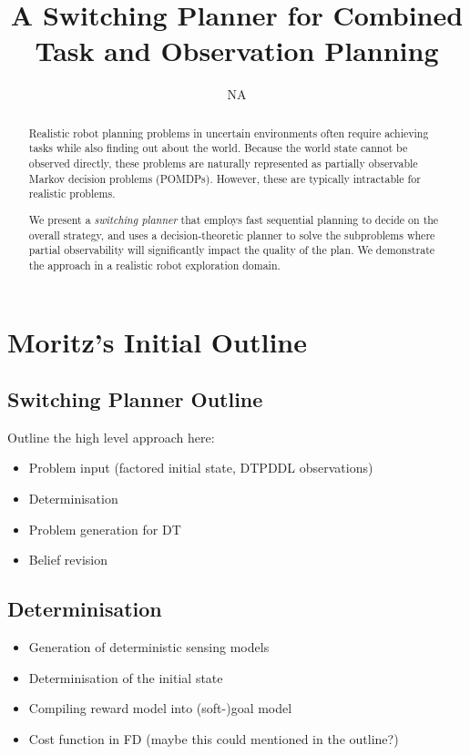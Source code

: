 \documentclass[letterpaper]{article}
\title{A Switching Planner for Combined Task and Observation Planning}
\author{NA}
\begin{document}
 
\maketitle

\begin{abstract}

Realistic robot planning problems in uncertain environments often
require achieving tasks while also finding out about the
world. Because the world state cannot be observed directly, these
problems are naturally represented as partially observable Markov
decision problems (POMDPs). However, these are typically intractable
for realistic problems.

We present a \emph{switching planner} that employs fast sequential
planning to decide on the overall strategy, and uses a
decision-theoretic planner to solve the subproblems where partial
observability will significantly impact the quality of the plan. We
demonstrate the approach in a realistic robot exploration domain.

\end{abstract}

\section{Moritz's Initial Outline}

\subsection{Switching Planner Outline}

Outline the high level approach here:
\begin{itemize}
\item Problem input (factored initial state, DTPDDL observations)
\item Determinisation
\item Problem generation for DT
\item Belief revision
\end{itemize}

\subsection{Determinisation}

\begin{itemize}
\item Generation of deterministic sensing models
\item Determinisation of the initial state
\item Compiling reward model into (soft-)goal model
\item Cost function in FD (maybe this could mentioned in the outline?)
\end{itemize}
\end{document}

